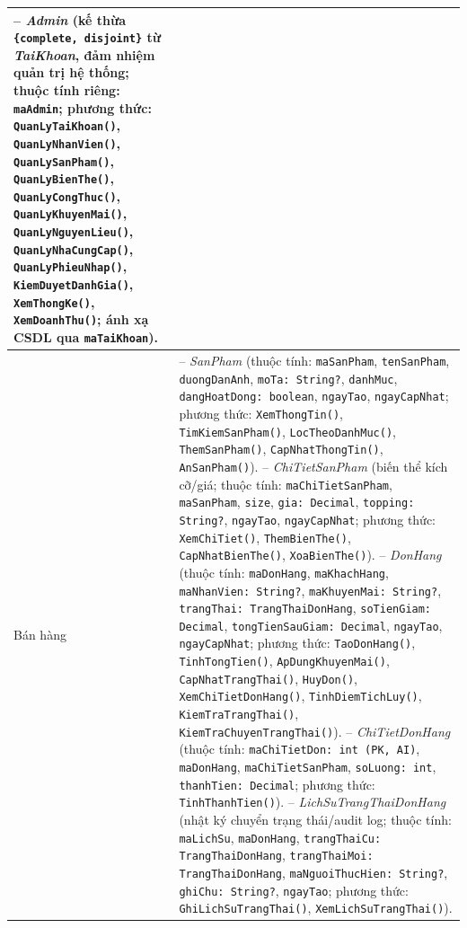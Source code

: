 \documentclass[12pt,a4paper]{report}
\begin{document}
\begin{longtable}{>{\raggedright\arraybackslash}p{3.8cm}>{\raggedright\arraybackslash}p{11.4cm}}
-- \textit{Admin} (kế thừa \texttt{\{complete, disjoint\}} từ \textit{TaiKhoan}, đảm nhiệm quản trị hệ thống; thuộc tính riêng: \texttt{maAdmin}; phương thức: \texttt{QuanLyTaiKhoan()}, \texttt{QuanLyNhanVien()}, \texttt{QuanLySanPham()}, \texttt{QuanLyBienThe()}, \texttt{QuanLyCongThuc()}, \texttt{QuanLyKhuyenMai()}, \texttt{QuanLyNguyenLieu()}, \texttt{QuanLyNhaCungCap()}, \texttt{QuanLyPhieuNhap()}, \texttt{KiemDuyetDanhGia()}, \texttt{XemThongKe()}, \texttt{XemDoanhThu()}; ánh xạ CSDL qua \texttt{maTaiKhoan}). \\
\hline
Bán hàng & -- \textit{SanPham} (thuộc tính: \texttt{maSanPham}, \texttt{tenSanPham}, \texttt{duongDanAnh}, \texttt{moTa: String?}, \texttt{danhMuc}, \texttt{dangHoatDong: boolean}, \texttt{ngayTao}, \texttt{ngayCapNhat}; phương thức: \texttt{XemThongTin()}, \texttt{TimKiemSanPham()}, \texttt{LocTheoDanhMuc()}, \texttt{ThemSanPham()}, \texttt{CapNhatThongTin()}, \texttt{AnSanPham()}). \newline
-- \textit{ChiTietSanPham} (biến thể kích cỡ/giá; thuộc tính: \texttt{maChiTietSanPham}, \texttt{maSanPham}, \texttt{size}, \texttt{gia: Decimal}, \texttt{topping: String?}, \texttt{ngayTao}, \texttt{ngayCapNhat}; phương thức: \texttt{XemChiTiet()}, \texttt{ThemBienThe()}, \texttt{CapNhatBienThe()}, \texttt{XoaBienThe()}). \newline
-- \textit{DonHang} (thuộc tính: \texttt{maDonHang}, \texttt{maKhachHang}, \texttt{maNhanVien: String?}, \texttt{maKhuyenMai: String?}, \texttt{trangThai: TrangThaiDonHang}, \texttt{soTienGiam: Decimal}, \texttt{tongTienSauGiam: Decimal}, \texttt{ngayTao}, \texttt{ngayCapNhat}; phương thức: \texttt{TaoDonHang()}, \texttt{TinhTongTien()}, \texttt{ApDungKhuyenMai()}, \texttt{CapNhatTrangThai()}, \texttt{HuyDon()}, \texttt{XemChiTietDonHang()}, \texttt{TinhDiemTichLuy()}, \texttt{KiemTraTrangThai()}, \texttt{KiemTraChuyenTrangThai()}). \newline
-- \textit{ChiTietDonHang} (thuộc tính: \texttt{maChiTietDon: int (PK, AI)}, \texttt{maDonHang}, \texttt{maChiTietSanPham}, \texttt{soLuong: int}, \texttt{thanhTien: Decimal}; phương thức: \texttt{TinhThanhTien()}). \newline
-- \textit{LichSuTrangThaiDonHang} (nhật ký chuyển trạng thái/audit log; thuộc tính: \texttt{maLichSu}, \texttt{maDonHang}, \texttt{trangThaiCu: TrangThaiDonHang}, \texttt{trangThaiMoi: TrangThaiDonHang}, \texttt{maNguoiThucHien: String?}, \texttt{ghiChu: String?}, \texttt{ngayTao}; phương thức: \texttt{GhiLichSuTrangThai()}, \texttt{XemLichSuTrangThai()}). \newline

\end{longtable}
\end{document}
